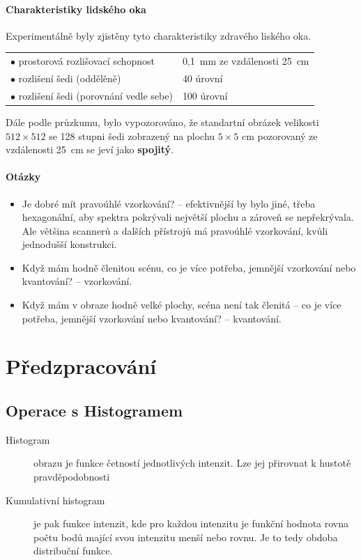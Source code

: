 \paragraph{Charakteristiky lidského oka} Experimentálně byly zjistěny tyto charakteristiky zdravého liského oka.
\smallskip

\begin{tabular}{ll}
$\bullet$ prostorová rozlišovací schopnost& 0,1~mm ze vzdálenosti 25~cm\\
$\bullet$ rozlišení šedi (oddělěně) & 40 úrovní \\
$\bullet$ rozlišení šedi (porovnání vedle sebe) & 100 úrovní 
\end{tabular}

\medskip
\noindent Dále podle průzkumu, bylo vypozorováno, že standartní obrázek velikosti $512\times512$ se 128 stupni šedi 
zobrazený na plochu $5\times5$ cm pozorovaný ze vzdálenosti 25~cm se jeví jako {\bf spojitý}.

\paragraph{Otázky}
\begin{itemize}
\item Je dobré mít pravoúhlé vzorkování? -- efektivnější by bylo jiné, třeba hexagonální, aby spektra pokrývali největší plochu a zároveň se nepřekrývala. Ale většina scannerů a dalších přístrojů má pravoúhlé vzorkování, kvůli jednodušší konstrukci.
\item Když mám hodně členitou scénu, co je více potřeba, jemnější vzorkování nebo kvantování? -- vzorkování.
\item Když mám v obraze hodně velké plochy, scéna není tak členitá -- co je více potřeba, jemnější vzorkování nebo kvantování? -- kvantování.
\end{itemize}

\section{Předzpracování}
\subsection{Operace s Histogramem}

\begin{description}
\item[Histogram] obrazu je funkce četností jednotlivých intenzit. Lze jej přirovnat k hustotě pravděpodobnosti
\item[Kumulativní histogram] je pak funkce intenzit, kde pro každou intenzitu je funkční hodnota rovna počtu bodů
 mající svou intenzitu menší nebo rovnu. Je to tedy obdoba distribuční funkce.
\end{description} 

